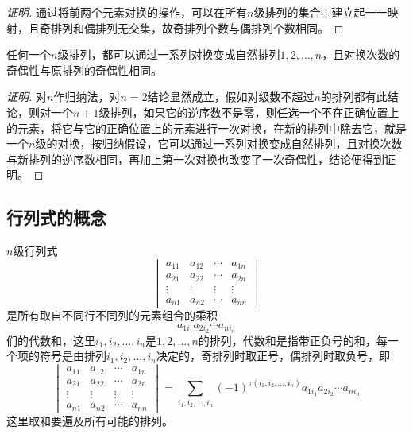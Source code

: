 \begin{proof}[证明]
  通过将前两个元素对换的操作，可以在所有$n$级排列的集合中建立起一一映射，且奇排列和偶排列无交集，故奇排列个数与偶排列个数相同。
\end{proof}

\begin{theorem}
  任何一个$n$级排列，都可以通过一系列对换变成自然排列$1,2,\ldots,n$，且对换次数的奇偶性与原排列的奇偶性相同。
\end{theorem}

\begin{proof}[证明]
  对$n$作归纳法，对$n=2$结论显然成立，假如对级数不超过$n$的排列都有此结论，则对一个$n+1$级排列，如果它的逆序数不是零，则任选一个不在正确位置上的元素，将它与它的正确位置上的元素进行一次对换，在新的排列中除去它，就是一个$n$级的对换，按归纳假设，它可以通过一系列对换变成自然排列，且对换次数与新排列的逆序数相同，再加上第一次对换也改变了一次奇偶性，结论便得到证明。
\end{proof}

\subsection{行列式的概念}
\label{sec:concept-of-determinant}

\begin{definition}
  $n$级行列式
  \[
  \begin{vmatrix}
    a_{11} & a_{12} & \cdots & a_{1n} \\
    a_{21} & a_{22} & \cdots & a_{2n} \\
    \vdots & \vdots & \vdots & \vdots \\
    a_{n1} & a_{n2} & \cdots & a_{nn}
  \end{vmatrix}
\]
是所有取自不同行不同列的元素组合的乘积
\[ a_{1i_1}a_{2i_2}\cdots a_{ni_n} \]
们的代数和，这里$i_1,i_2,\ldots,i_n$是$1,2,\ldots,n$的排列，代数和是指带正负号的和，每一个项的符号是由排列$i_1,i_2,\ldots,i_n$决定的，奇排列时取正号，偶排列时取负号，即
  \[
  \begin{vmatrix}
    a_{11} & a_{12} & \cdots & a_{1n} \\
    a_{21} & a_{22} & \cdots & a_{2n} \\
    \vdots & \vdots & \vdots & \vdots \\
    a_{n1} & a_{n2} & \cdots & a_{nn}
  \end{vmatrix}
  = \sum_{i_1,i_2,\ldots,i_n} (-1)^{\tau(i_1,i_2,\ldots,i_n)} a_{1i_1}a_{2i_2}\cdots a_{ni_n}
\]
这里取和要遍及所有可能的排列。
\end{definition}

